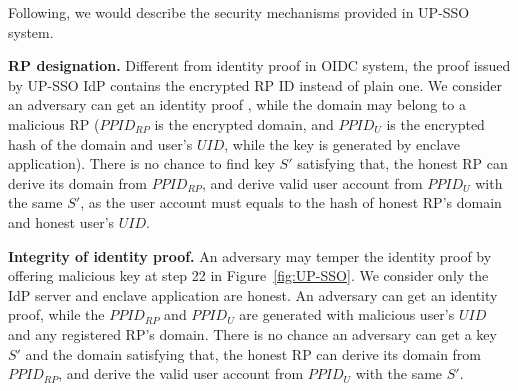 Following, we would describe the security mechanisms provided in UP-SSO system. 



\vspace{1mm}\noindent\textbf{RP designation.} 
Different from identity proof in OIDC system, the proof issued by UP-SSO IdP contains the encrypted RP ID instead of plain one. 
We consider an adversary can get an identity proof
, while the domain may belong to a malicious RP ($PPID_{RP}$ is the encrypted domain, and $PPID_U$ is the encrypted hash of the domain and user's $UID$, while the key is generated by enclave application).
There is no chance to find key $S'$ satisfying that, the honest RP can derive its domain from $PPID_{RP}$, and derive valid user account from $PPID_U$ with the same $S'$, as the user account must equals to the hash of honest RP's domain and honest user's $UID$.


\vspace{1mm}\noindent\textbf{Integrity of identity proof.}
An adversary may temper the identity proof by offering malicious key at step 22 in Figure~\ref{fig:UP-SSO}. 
We consider  only the IdP server and enclave application are honest. 
An adversary can get an identity proof, 
while the $PPID_{RP}$ and $PPID_U$ are generated with malicious user's $UID$ and any registered RP's domain.
There is no chance an adversary can get a key $S'$ and the domain satisfying that, 
the honest RP can derive its domain from $PPID_{RP}$, and derive the valid user account from $PPID_U$ with the same $S'$. 


